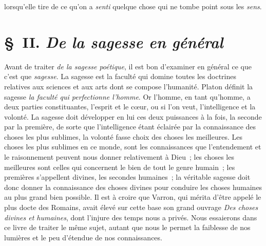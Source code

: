 \documentclass[french,twoside]{book} %
\begin{document}
lorsqu’elle tire de ce qu’on a {\itshape senti} quelque chose qui ne tombe point sous les {\itshape sens}.
\section[{§ II. De la sagesse en général}]{§ II. {\itshape De la sagesse en général}}
\noindent Avant de traiter {\itshape de la sagesse poétique}, il est bon d’examiner en général ce que c’est que {\itshape sagesse}. La sagesse est la faculté qui domine toutes les doctrines relatives aux sciences et aux arts dont se compose l’humanité. Platon définit la sagesse \emph{{\itshape la faculté qui perfectionne l’homme}}. Or l’homme, en tant qu’homme, a deux parties constituantes, l’esprit et le cœur, ou si l’on veut, l’intelligence et la volonté. La sagesse doit développer en lui ces deux puissances à la fois, la seconde par la première, de sorte que l’intelligence étant éclairée par la connaissance des choses les plus sublimes, la volonté fasse choix des choses les meilleures. Les choses les plus sublimes en ce monde, sont les connaissances que l’entendement  et le raisonnement peuvent nous donner relativement à Dieu ; les choses les meilleures sont celles qui concernent le bien de tout le genre humain ; les premières s’appellent divines, les secondes humaines ; la véritable sagesse doit donc donner la connaissance des choses divines pour conduire les choses humaines au plus grand bien possible. Il est à croire que Varron, qui mérita d’être appelé le plus docte des Romains, avait élevé sur cette base son grand ouvrage {\itshape Des choses divines et humaines}, dont l’injure des temps nous a privés. Nous essaierons dans ce livre de traiter le même sujet, autant que nous le permet la faiblesse de nos lumières et le peu d’étendue de nos connaissances.\par
\end{document}
